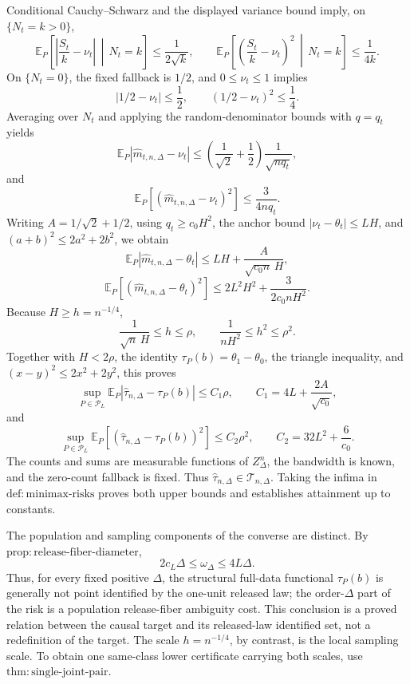 Conditional Cauchy--Schwarz and the displayed variance bound imply, on \(\{N_t=k>0\}\),
\[
 \mathbb E_P\!\left[\left|\frac{S_t}{k}-\nu_t\right|\,\middle|\,N_t=k\right]
 \leq\frac1{2\sqrt k},
 \qquad
 \mathbb E_P\!\left[\left(\frac{S_t}{k}-\nu_t\right)^2\,\middle|\,N_t=k\right]
 \leq\frac1{4k}.
\]
On \(\{N_t=0\}\), the fixed fallback is \(1/2\), and \(0\leq\nu_t\leq1\) implies
\[
 |1/2-\nu_t|\leq\frac12,
 \qquad (1/2-\nu_t)^2\leq\frac14.
\]
Averaging over \(N_t\) and applying the random-denominator bounds with \(q=q_t\) yields
\[
 \mathbb E_P|\widehat m_{t,n,\Delta}-\nu_t|
 \leq\left(\frac1{\sqrt2}+\frac12\right)\frac1{\sqrt{nq_t}},
\]
and
\[
 \mathbb E_P[(\widehat m_{t,n,\Delta}-\nu_t)^2]
 \leq\frac3{4nq_t}.
\]
Writing \(A=1/\sqrt2+1/2\), using \(q_t\geq c_0H^2\), the anchor bound \(|\nu_t-\theta_t|\leq LH\), and \((a+b)^2\leq2a^2+2b^2\), we obtain
\[
 \mathbb E_P|\widehat m_{t,n,\Delta}-\theta_t|
 \leq LH+\frac{A}{\sqrt{c_0n}\,H},
\]
\[
 \mathbb E_P[(\widehat m_{t,n,\Delta}-\theta_t)^2]
 \leq2L^2H^2+\frac3{2c_0nH^2}.
\]
Because \(H\geq h=n^{-1/4}\),
\[
 \frac1{\sqrt n\,H}\leq h\leq\rho,
 \qquad
 \frac1{nH^2}\leq h^2\leq\rho^2.
\]
Together with \(H<2\rho\), the identity \(\tau_P(b)=\theta_1-\theta_0\), the triangle inequality, and \((x-y)^2\leq2x^2+2y^2\), this proves
\[
 \sup_{P\in\mathcal P_L}
 \mathbb E_P|\widehat\tau_{n,\Delta}-\tau_P(b)|
 \leq C_1\rho,
 \qquad
 C_1=4L+\frac{2A}{\sqrt{c_0}},
\]
and
\[
 \sup_{P\in\mathcal P_L}
 \mathbb E_P[(\widehat\tau_{n,\Delta}-\tau_P(b))^2]
 \leq C_2\rho^2,
 \qquad
 C_2=32L^2+\frac6{c_0}.
\]
The counts and sums are measurable functions of \(Z_\Delta^n\), the bandwidth is known, and the zero-count fallback is fixed.  Thus \(\widehat\tau_{n,\Delta}\in\mathcal T_{n,\Delta}\).  Taking the infima in \(\mathrm{def:minimax\text{-}risks}\) proves both upper bounds and establishes attainment up to constants.

The population and sampling components of the converse are distinct.  By \(\mathrm{prop:release\text{-}fiber\text{-}diameter}\),
\[
 2c_L\Delta\leq\omega_\Delta\leq4L\Delta.
\]
Thus, for every fixed positive \(\Delta\), the structural full-data functional \(\tau_P(b)\) is generally not point identified by the one-unit released law; the order-\(\Delta\) part of the risk is a population release-fiber ambiguity cost.  This conclusion is a proved relation between the causal target and its released-law identified set, not a redefinition of the target.  The scale \(h=n^{-1/4}\), by contrast, is the local sampling scale.  To obtain one same-class lower certificate carrying both scales, use \(\mathrm{thm:single\text{-}joint\text{-}pair}\).

